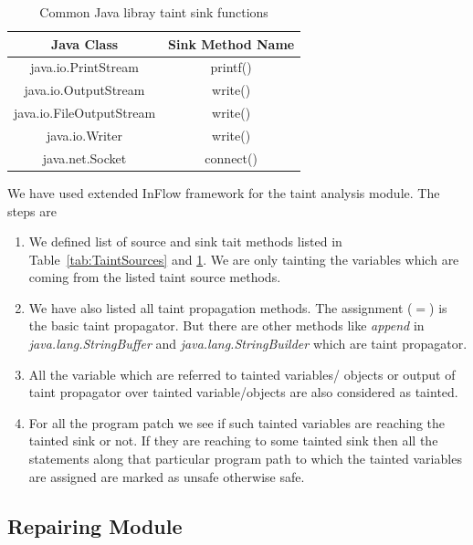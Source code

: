 \begin{table}[!htb]
\centering
\caption{Common Java libray taint sink functions}
\label{tab:TaintSinks}
\begin{tabular}{|c|c|}
\hline

 \textbf{Java Class} & \textbf{Sink Method Name}\\
 \hline java.io.PrintStream & printf()\\ \hline
 java.io.OutputStream & write()\\ \hline
 java.io.FileOutputStream & write()\\ \hline
 java.io.Writer & write()\\ \hline
 java.net.Socket & connect()\\ \hline

\end{tabular}
\end{table}


We have used extended InFlow framework for the taint analysis module. The steps
are

\begin{enumerate}
  \item We defined list of source and sink tait methods listed in
  Table~\ref{tab:TaintSources} and \ref{tab:TaintSinks}. We are only tainting
  the variables which are coming from the listed taint source methods.
  \item We have also listed all taint propagation methods. The assignment ($=$)
  is the basic taint propagator. But there are other methods like \emph{append}
  in \emph{java.lang.StringBuffer} and \emph{java.lang.StringBuilder} which are
  taint propagator.
  \item All the variable which are referred to tainted variables/ objects or
  output of taint propagator over tainted variable/objects are also considered
  as tainted.
  \item For all the program patch we see if such tainted variables are reaching
  the tainted sink or not. If they are reaching to some tainted sink then all
  the statements along that particular program path to which the tainted
  variables are assigned are marked as unsafe otherwise safe.
\end{enumerate}


\subsection{Repairing Module}
\label{subsec:RepairingModule}

